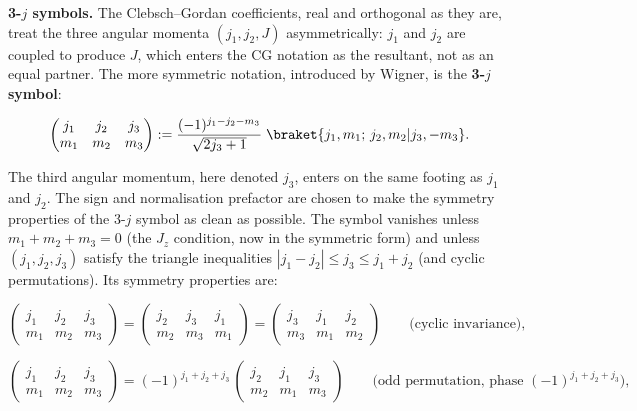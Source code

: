\medskip\noindent\textbf{3-$j$ symbols.}
The Clebsch--Gordan coefficients, real and orthogonal as they are, treat the three angular momenta $(j_1,j_2,J)$ asymmetrically: $j_1$ and $j_2$ are coupled to produce $J$, which enters the CG notation as the resultant, not as an equal partner. The more symmetric notation, introduced by Wigner, is the \textbf{3-$j$ symbol}:
\begin{linenomath}
  \begin{equation}
    \begin{pmatrix}
      j_1 & j_2 & j_3 \\
      m_1 & m_2 & m_3
    \end{pmatrix}
    := \frac{(-1)^{j_1-j_2-m_3}}{\sqrt{2j_3+1}}\;
       \braket{j_1,m_1;\,j_2,m_2|j_3,-m_3}.
    \label{eq:3j-symbol}
  \end{equation}
\end{linenomath}
The third angular momentum, here denoted $j_3$, enters on the same footing as $j_1$ and $j_2$. The sign and normalisation prefactor are chosen to make the symmetry properties of the 3-$j$ symbol as clean as possible. The symbol vanishes unless $m_1+m_2+m_3 = 0$ (the $J_z$ condition, now in the symmetric form) and unless $(j_1,j_2,j_3)$ satisfy the triangle inequalities $|j_1-j_2|\le j_3\le j_1+j_2$ (and cyclic permutations). Its symmetry properties are:
\begin{linenomath}
  \begin{equation*}
    \begin{pmatrix}j_1&j_2&j_3\\ m_1&m_2&m_3\end{pmatrix}
    = \begin{pmatrix}j_2&j_3&j_1\\ m_2&m_3&m_1\end{pmatrix}
    = \begin{pmatrix}j_3&j_1&j_2\\ m_3&m_1&m_2\end{pmatrix}
    \qquad\text{(cyclic invariance)},
  \end{equation*}
\end{linenomath}
\begin{linenomath}
  \begin{equation*}
    \begin{pmatrix}j_1&j_2&j_3\\ m_1&m_2&m_3\end{pmatrix}
    = (-1)^{j_1+j_2+j_3}\,
      \begin{pmatrix}j_2&j_1&j_3\\ m_2&m_1&m_3\end{pmatrix}
    \qquad\text{(odd permutation, phase $(-1)^{j_1+j_2+j_3}$)},
  \end{equation*}
\end{linenomath}
